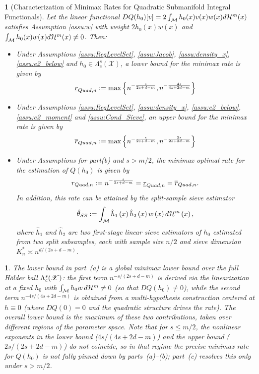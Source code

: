 \documentclass[12pt,american]{article}
\newcommand{\cH}{\mathcal{H}}
\theoremstyle{definition}
\theoremstyle{plain}
\theoremstyle{definition}
\theoremstyle{plain}
\newtheorem{lem}{\protect\lemmaname}
\theoremstyle{plain}
\theoremstyle{plain}
\theoremstyle{plain}
\newtheorem{rem}{\protect\remarkname}
\theoremstyle{plain}
\providecommand{\lemmaname}{Lemma}
\providecommand{\remarkname}{Remark}
\providecommand{\lemmaname}{Lemma}
\begin{document}
\begin{lem}[Characterization of Minimax Rates for Quadratic Submanifold Integral Functionals]\label{lem:Rate_Quad} Let the linear functional $DQ(h_0)[v] = 2\int_\cM h_0(x)v(x)w(x)d\cH^m(x)$ satisfies Assumption \ref{assu:w} with weight $2h_0(x)w(x)$ and $\int_\cM h_0(x)w(x)d\cH^m(x) \neq 0$. Then:
\begin{itemize}
    \item[(a)] Under Assumptions \ref{assu:RegLevelSet}, \ref{assu:Jacob}, \ref{assu:density_x}, \ref{assu:e2_below} and $h_0\in\Lambda^s_c (\mathcal{X})$, a lower bound for the minimax rate is given by
    \begin{equation}\label{eq:quad_lb}
    \underline{r}_{Quad,n} := \max\left\{n^{-\frac{s}{2s + d - m}}, n^{-\frac{4s}{4s + 2d - m}}\right\}
    \end{equation}
    \item[(b)]  Under Assumptions \ref{assu:RegLevelSet}, \ref{assu:density_x}, \ref{assu:e2_below}, \ref{assu:e2_moment} and \ref{assu:Cond_Sieve}, an upper bound for the minimax rate is given by
    \begin{equation}\label{eq:quad_ub}
    \overline{r}_{Quad,n} := \max\left\{n^{-\frac{s}{2s + d - m}}, n^{-\frac{2s}{2s + 2d - m}}\right\}
    \end{equation}
    \item[(c)] Under Assumptions for part(b) and $s> m/2$, the minimax optimal rate for the estimation of $Q(h_0)$ is given by $$r_{Quad,n} := n^{-\frac{s}{2s + d - m}} =\underline{r}_{Quad,n} = \overline{r}_{Quad,n}.$$ In addition, this rate can be attained by the split-sample sieve estimator
\[
\hat{\theta}_{SS}:=\int_{{\cal M}}\hat{h}_{1}\left(x\right)\hat{h}_{2}\left(x\right)w\left(x\right)d{\cal H}^{m}\left(x\right),
\]
where $\hat{h}_{1}$ and $\hat{h}_{2}$ are two first-stage linear
sieve estimators of $h_{0}$ estimated from two split subsamples, each with sample size $n/2$ and sieve dimension $K^*_{n}\asymp n^{d/(2s+d-m)}$.
\end{itemize}
\end{lem}

\begin{rem}\label{rem:Quad_tworegions}
The lower bound in part~(a) is a \emph{global} minimax lower bound over the full H\"older ball $\Lambda_c^s(\mathscr{X})$:
the first term $n^{-s/(2s+d-m)}$ is derived via the linearization at a fixed $h_0$ with $\int_\cM h_0 w\,d\cH^m\neq 0$
(so that $DQ(h_0)\neq 0$), while the second term $n^{-4s/(4s+2d-m)}$ is obtained from a multi-hypothesis
construction centered at $h\equiv 0$ (where $DQ(0)=0$ and the quadratic structure drives the rate).
The overall lower bound is the maximum of these two contributions, taken over different regions of the parameter space.
Note that for $s\le m/2$, the nonlinear exponents in the lower bound ($4s/(4s+2d-m)$) and the upper bound ($2s/(2s+2d-m)$) do not coincide, so in that regime the precise minimax rate for $Q(h_0)$ is not fully pinned down by parts~(a)--(b); part~(c) resolves this only under $s>m/2$.
\end{rem}
\end{document}
